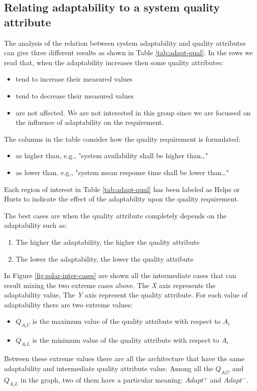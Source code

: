 \subsection{Relating adaptability to a system quality attribute}
The analysis of the relation between system adaptability and quality attributes can give three different results as shown in Table \ref{tab:adapt-qual}.  In the rows we read that, when the adaptability increases then some quality attributes:
\begin{itemize}
	\item tend to increase their measured values
	\item tend to decrease their measured values
	\item are not affected. We are not interested in this group since we are focussed on the influence of adaptability on the requirement.
\end{itemize}

\noindent The columns in the table consider how the quality requirement is formulated:
\begin{itemize}
	\item as higher than, e.g., "system availability shall be higher than\dots"
	\item as lower than, e.g., "system mean response time shall be lower than\dots"
\end{itemize}

Each region of interest in Table \ref{tab:adapt-qual} has been labeled as Helps or Hurts to indicate the effect of the adaptability upon the quality requirement. 

\noindent The best cases are when the quality attribute completely depends on the adaptability such as:
\begin{enumerate}
	\item The higher the adaptability, the higher the quality attribute
	\item The lower the adaptability, the lower the quality attribute
\end{enumerate}

In Figure \ref{fig:solar-inter-cases} are shown all the intermediate cases that can result mixing the two extreme cases above. The \emph{X} axis represents the adaptability value, The \emph{Y} axis represent the quality attribute. For each value of adaptability there are two extreme values:
\begin{itemize}
	\item $Q_{A_iU}$ is the maximum value of the quality attribute with respect to $A_i$
	\item $Q_{A_iL}$ is the minimum value of the quality attribute with respect to $A_i$
\end{itemize} 
Between these extreme values there are all the architecture that have the same adaptability and intermediate quality attribute value. Among all the $Q_{A_iU}$ and $Q_{A_iL}$ in the graph, two of them have a particular meaning: $Adapt^+$ and $Adapt^-$.

